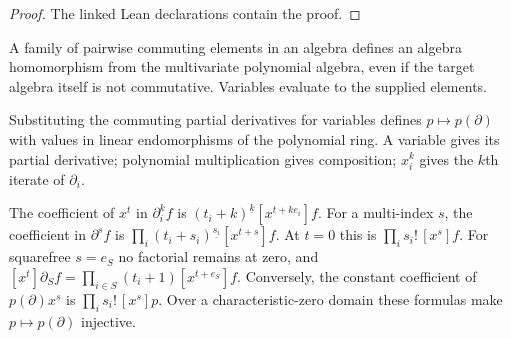 \begin{proof}

\leanok

The linked Lean declarations contain the proof.

\end{proof}

\begin{definition}

\label{def:commuting-eval}


\leanok

A family of pairwise commuting elements in an algebra defines an algebra homomorphism
from the multivariate polynomial algebra, even if the target algebra itself is not
commutative. Variables evaluate to the supplied elements.

\end{definition}

\begin{definition}

\label{def:differential-op}


\leanok


Substituting the commuting partial derivatives for variables defines
$p\mapsto p(\partial)$ with values in linear endomorphisms of the polynomial ring.
A variable gives its partial derivative; polynomial multiplication gives composition;
$x_i^k$ gives the $k$th iterate of $\partial_i$.

\end{definition}

\begin{lemma}

\label{lem:operator-coeff}


\leanok


The coefficient of $x^t$ in $\partial_i^k f$ is
$(t_i+k)^{\underline{k}}[x^{t+ke_i}]f$. For a multi-index $s$, the coefficient in
$\partial^s f$ is $\prod_i(t_i+s_i)^{\underline{s_i}}[x^{t+s}]f$.
At $t=0$ this is $\prod_i s_i!\,[x^s]f$.
For squarefree $s=e_S$ no factorial remains at zero, and
$[x^t]\partial_S f=\prod_{i\in S}(t_i+1)[x^{t+e_S}]f$.
Conversely, the constant coefficient of $p(\partial)x^s$ is $\prod_i s_i!\,[x^s]p$.
Over a characteristic-zero domain these formulas make $p\mapsto p(\partial)$ injective.

\end{lemma}

